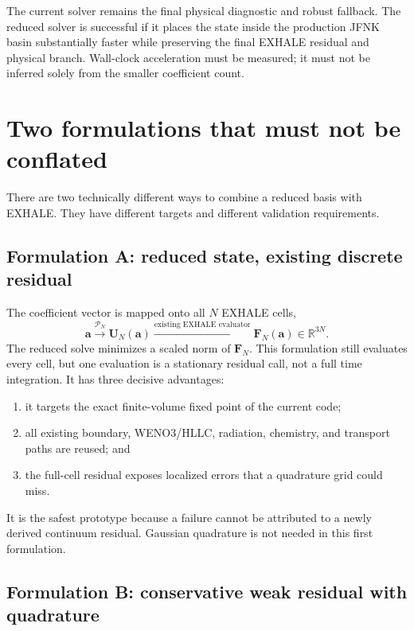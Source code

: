 \documentclass[english,a4paper]{my_memo}
\newcommand{\vect}[1]{\mathbf{#1}}
\newcommand{\Ustate}{\vect{U}}
\newcommand{\coef}{\vect{a}}
\begin{document}
The current solver remains the final physical diagnostic and robust fallback.
The reduced solver is successful if it places the state inside the production
JFNK basin substantially faster while preserving the final EXHALE residual and
physical branch.  Wall-clock acceleration must be measured; it must not be
inferred solely from the smaller coefficient count.

\section{Two formulations that must not be conflated}\label{sec:twoforms}

There are two technically different ways to combine a reduced basis with
EXHALE.  They have different targets and different validation requirements.

\subsection{Formulation A: reduced state, existing discrete residual}

The coefficient vector is mapped onto all \(N\) EXHALE cells,
\begin{equation}
  \coef \xrightarrow{\mathcal{P}_N} \Ustate_N(\coef)
  \xrightarrow{\text{existing EXHALE evaluator}}
  \vect{F}_N(\coef)\in\mathbb{R}^{3N}.
  \label{eq:formA}
\end{equation}
The reduced solve minimizes a scaled norm of \(\vect{F}_N\).  This formulation
still evaluates every cell, but one evaluation is a stationary residual call,
not a full time integration.  It has three decisive advantages:
\begin{enumerate}
\item it targets the exact finite-volume fixed point of the current code;
\item all existing boundary, WENO3/HLLC, radiation, chemistry, and transport
  paths are reused; and
\item the full-cell residual exposes localized errors that a quadrature grid
  could miss.
\end{enumerate}

It is the safest prototype because a failure cannot be attributed to a newly
derived continuum residual.  Gaussian quadrature is not needed in this first
formulation.

\subsection{Formulation B: conservative weak residual with quadrature}
\end{document}
